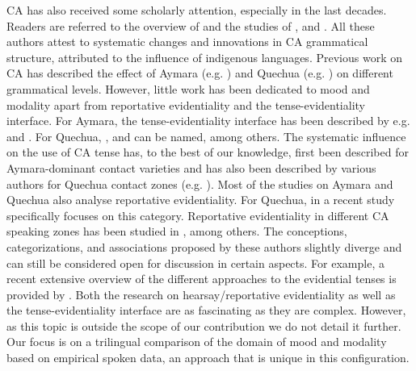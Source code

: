 \documentclass[output=paper,hidelinks]{langscibook}
\begin{document}
CA has also received some scholarly attention, especially in the last decades. Readers are referred to the overview of \citet{RN54} and the studies of \citet{pfander2009gramatica, merma2007contacto, haboud2008mujeres}, and \citet{mendoza1991castellano}. All these authors attest to systematic changes and innovations in CA grammatical structure, attributed to the influence of indigenous languages. Previous work on CA has described the effect of Aymara (e.g. \cite{hardman1982mutual, quartararo2017evidencialidad}) and Quechua (e.g. \cite{RN52, quartararo2017evidencialidad}) on different grammatical levels. However, little work has been dedicated to mood and modality apart from reportative evidentiality and the tense-evidentiality interface.
For Aymara, the tense-evidentiality interface has been described by e.g. \citet{coler2015aymara} and \citet{MartinezVera}. For Quechua, \citet{faller2002semantics, howard2018}, and \citet{manley2015} can be named, among others. The systematic influence on the use of CA tense has, to the best of our knowledge, first been described for Aymara-dominant contact varieties \citep{schumacher1980, hardman1982mutual, stratford1991} and has also been described by various authors for Quechua contact zones (e.g. \cite{andrade2005, andrade2020, dankel2012convergencias, escobar1997, escobarcrespo2021, garcia2015valores, kleeocampo1995, palacios2018introduccion, pfander2013evidencialidad, sanchez2004}). Most of the studies on Aymara and Quechua also analyse reportative evidentiality. For Quechua, \citet{kalt2021} in a recent study specifically focuses on this category. Reportative evidentiality in different CA speaking zones has been studied in \citet{andrade2007, babel2009, chang2018, dankel2015strategien, feke2004quechua, olbertz2005dizque}, among others. The conceptions, categorizations, and associations proposed by these authors slightly diverge and can still be considered open for discussion in certain aspects. For example, a recent extensive overview of the different approaches to the evidential tenses is provided by \citet[79--93]{andrade2020}. Both the research on hearsay/reportative evidentiality as well as the tense-evidentiality interface are as fascinating as they are complex. However, as this topic is outside the scope of our contribution we do not detail it further. Our focus is on a trilingual comparison of the domain of mood and modality based on empirical spoken data, an approach that is unique in this configuration. 
\end{document}
